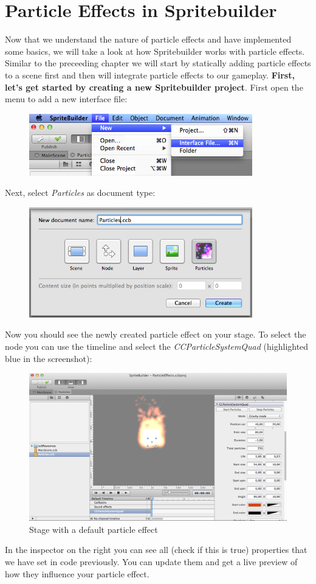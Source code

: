 \section{Particle Effects in Spritebuilder}
Now that we understand the nature of particle effects and have implemented some
basics, we will take a look at how Spritebuilder works with particle effects.
Similar to the preceeding chapter we will start by statically adding particle
effects to a scene first and then will integrate particle effects
to our gameplay.
\textbf{First, let's get started by creating a new Spritebuilder project}.
First open the menu to add a new interface file: 
\begin{figure}[H]
		\centering
		\includegraphics[width=275pt]{images/particles/Spritebuilder_ParticleEffect_Menu1.png}   
\end{figure}
Next, select \textit{Particles} as document type:
\begin{figure}[H]
		\centering
		\includegraphics[width=275pt]{images/particles/Spritebuilder_ParticleEffect_Menu2.png}   
\end{figure}
Now you should see the newly created particle effect on your stage. To select
the node you can use the timeline and select the \textit{CCParticleSystemQuad}
(highlighted blue in the screenshot):
\begin{figure}[H]
		\centering
		\includegraphics[width=375pt]{images/particles/Spritebuilder_ParticleEffect_CCB.png}   
		\caption{Stage with a default particle effect}
\end{figure}
In the inspector on the right you can see all (check if this is true) properties
that we have set in code previously. You can update them and get a live preview
of how they influence your particle effect. 

